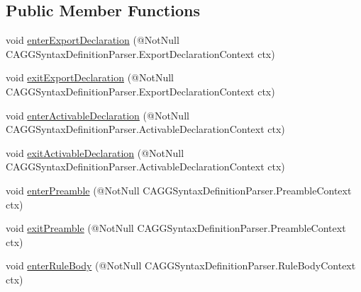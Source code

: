 \subsection*{Public Member Functions}
\begin{DoxyCompactItemize}
\item 
void \hyperlink{classit_1_1emarolab_1_1cagg_1_1core_1_1language_1_1parser_1_1ANTLRInterface_1_1ANTLRGenerated_1_1a45b55289931e185944c10a916c8cdd_a8ae1851071e86d24afa4e13ca1e18c3c}{enter\-Export\-Declaration} (@Not\-Null C\-A\-G\-G\-Syntax\-Definition\-Parser.\-Export\-Declaration\-Context ctx)
\item 
void \hyperlink{classit_1_1emarolab_1_1cagg_1_1core_1_1language_1_1parser_1_1ANTLRInterface_1_1ANTLRGenerated_1_1a45b55289931e185944c10a916c8cdd_a14a6aa7b6d614afbfae0b7d0d9d100fb}{exit\-Export\-Declaration} (@Not\-Null C\-A\-G\-G\-Syntax\-Definition\-Parser.\-Export\-Declaration\-Context ctx)
\item 
void \hyperlink{classit_1_1emarolab_1_1cagg_1_1core_1_1language_1_1parser_1_1ANTLRInterface_1_1ANTLRGenerated_1_1a45b55289931e185944c10a916c8cdd_a51e7806811f37b338ab88c66140a0465}{enter\-Activable\-Declaration} (@Not\-Null C\-A\-G\-G\-Syntax\-Definition\-Parser.\-Activable\-Declaration\-Context ctx)
\item 
void \hyperlink{classit_1_1emarolab_1_1cagg_1_1core_1_1language_1_1parser_1_1ANTLRInterface_1_1ANTLRGenerated_1_1a45b55289931e185944c10a916c8cdd_adc1ae417ec191fb740e11221a74591c3}{exit\-Activable\-Declaration} (@Not\-Null C\-A\-G\-G\-Syntax\-Definition\-Parser.\-Activable\-Declaration\-Context ctx)
\item 
void \hyperlink{classit_1_1emarolab_1_1cagg_1_1core_1_1language_1_1parser_1_1ANTLRInterface_1_1ANTLRGenerated_1_1a45b55289931e185944c10a916c8cdd_acc069468c013ced5d58c0c7acf0d180a}{enter\-Preamble} (@Not\-Null C\-A\-G\-G\-Syntax\-Definition\-Parser.\-Preamble\-Context ctx)
\item 
void \hyperlink{classit_1_1emarolab_1_1cagg_1_1core_1_1language_1_1parser_1_1ANTLRInterface_1_1ANTLRGenerated_1_1a45b55289931e185944c10a916c8cdd_ace0fbdfb4ea286ba80f5d0b21ca4ab94}{exit\-Preamble} (@Not\-Null C\-A\-G\-G\-Syntax\-Definition\-Parser.\-Preamble\-Context ctx)
\item 
void \hyperlink{classit_1_1emarolab_1_1cagg_1_1core_1_1language_1_1parser_1_1ANTLRInterface_1_1ANTLRGenerated_1_1a45b55289931e185944c10a916c8cdd_a78ddc9d09b7e9c860c3dd58a4f22d476}{enter\-Rule\-Body} (@Not\-Null C\-A\-G\-G\-Syntax\-Definition\-Parser.\-Rule\-Body\-Context ctx)

\end{DoxyCompactItemize}
